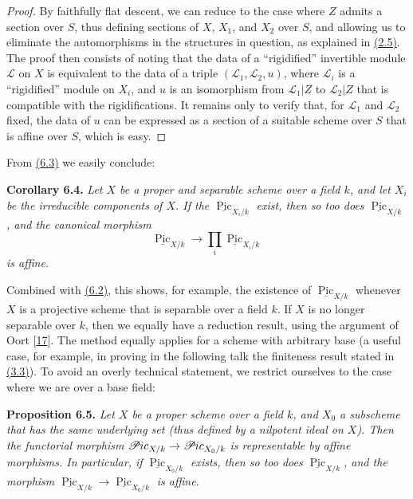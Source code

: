 \documentclass{article}
\newenvironment{itenv}[1]
  {\phantomsection\par\smallskip\noindent\textbf{#1.}\itshape}
  {\par\smallskip}
\newcommand{\oldpage}[1]{\marginpar{\footnotesize$\Big\vert$ \textit{p.~#1}}}
\theoremstyle{definition}
\theoremstyle{definition}
\theoremstyle{definition}
\theoremstyle{definition}
\theoremstyle{remark}
\begin{document}
\begin{proof}
By faithfully flat descent, we can reduce to the case where \(Z\) admits a section over \(S\), thus defining sections of \(X\), \(X_1\), and \(X_2\) over \(S\), and allowing us to eliminate the automorphisms in the structures in question, as explained in \protect\hyperlink{fga-3-v-remark-2.5}{(2.5)}.
\oldpage{232-17}The proof then consists of noting that the data of a ``rigidified'' invertible module \({\mathscr{L}}\) on \(X\) is equivalent to the data of a triple \(({\mathscr{L}}_1,{\mathscr{L}}_2,u)\), where \({\mathscr{L}}_i\) is a ``rigidified'' module on \(X_i\), and \(u\) is an isomorphism from \({\mathscr{L}}_1|Z\) to \({\mathscr{L}}_2|Z\) that is compatible with the rigidifications.
It remains only to verify that, for \({\mathscr{L}}_1\) and \({\mathscr{L}}_2\) fixed, the data of \(u\) can be expressed as a section of a suitable scheme over \(S\) that is affine over \(S\), which is easy.
\end{proof}

From \protect\hyperlink{fga-3-v-proposition-6.3}{(6.3)} we easily conclude:

\leavevmode{}%
\begin{itenv}{Corollary 6.4}
Let \(X\) be a proper and separable scheme over a field \(k\), and let \(X_i\) be the irreducible components of \(X\).
If the \(\underline{\operatorname{Pic}}_{X_i/k}\) exist, then so too does \(\underline{\operatorname{Pic}}_{X/k}\), and the canonical morphism
\[
  \underline{\operatorname{Pic}}_{X/k}
  \to \prod_i \underline{\operatorname{Pic}}_{X_i/k}
\]
is affine.

\end{itenv}

Combined with \protect\hyperlink{fga-3-v-corollary-6.2}{(6.2)}, this shows, for example, the existence of \(\underline{\operatorname{Pic}}_{X/k}\) whenever \(X\) is a projective scheme that is separable over a field \(k\).
If \(X\) is no longer separable over \(k\), then we equally have a reduction result, using the argument of Oort {[}\protect\hyperlink{ref-Oor1962}{17}{]}.
The method equally applies for a scheme with arbitrary base (a useful case, for example, in proving in the following talk the finiteness result stated in \protect\hyperlink{fga-3-v-remark-3.3}{(3.3)}).
To avoid an overly technical statement, we restrict ourselves to the case where we are over a base field:

\leavevmode{}%
\begin{itenv}{Proposition 6.5}
Let \(X\) be a proper scheme over a field \(k\), and \(X_0\) a subscheme that has the same underlying set (thus defined by a nilpotent ideal on \(X\)).
Then the functorial morphism \(\mathscr{P}\kern -.5pt ic_{X/k}\to\mathscr{P}\kern -.5pt ic_{X_0/k}\) is representable by affine morphisms.
In particular, if \(\underline{\operatorname{Pic}}_{X_0/k}\) exists, then so too does \(\underline{\operatorname{Pic}}_{X/k}\), and the morphism \(\underline{\operatorname{Pic}}_{X/k}\to\underline{\operatorname{Pic}}_{X_0/k}\) is affine.

\end{itenv}
\end{document}
